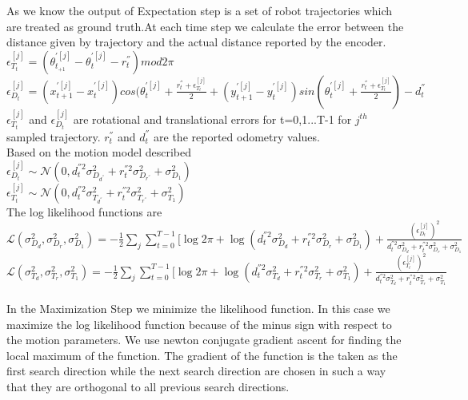 \documentclass[12pt]{dalcsthesis}
\begin{document}
As we know the output of Expectation step is a set of robot trajectories which are treated as ground truth.At each time step we calculate the error between the distance given by trajectory and the actual distance reported by the encoder.
\\
$\epsilon_{T_{t}}^{[j]}=(\theta_{t_{+1}}^{'[j]}-\theta_{t}^{'[j]}-r_{t}^{''})mod2\pi$ 
\\
$\epsilon_{D_{t}}^{[j]}=(x_{t+1}^{'[j]}-x_{t}^{'[j]})cos(\theta_{t}^{'[j]}+\frac{r_{t}^{''}+\epsilon_{T_{t}}^{[j]}}{2}+(y_{t+1}^{'[j]}-y_{t}^{'[j]})sin(\theta_{t}^{'[j]}+\frac{r_{t}^{''}+\epsilon_{T_{t}}^{[j]}}{2})-d_{t}^{''}$
\\
$\epsilon_{T_{t}}^{[j]}$ and $\epsilon_{D_{t}}^{[j]}$ are rotational and translational errors for t=0,1...T-1 for $j^{th}$ sampled trajectory. $r_{t}^{''}$ and $d_{t}^{''}$ are the reported odometry values. 
\\
Based on the motion model described 
\\
$\epsilon_{D_{t}}^{[j]}\sim\mathcal{{N}}(0,d_{t}^{''2}\sigma_{D_{d^{''}}}^{2}+r_{t}^{''2}\sigma_{D_{r^{''}}}^{2}+\sigma_{D_{1}}^{2})$
\\
$\epsilon_{T_{t}}^{[j]}\sim\mathcal{{N}}(0,d_{t}^{''2}\sigma_{T_{d^{''}}}^{2}+r_{t}^{''2}\sigma_{T_{r^{''}}}^{2}+\sigma_{T_{1}}^{2})$
\\
The log likelihood functions are
\\
$\mathcal{{L}}(\sigma_{D_{d}}^{2},\sigma_{D_{r}}^{2},\sigma_{D_{1}}^{2})=-\frac{1}{2}\sum_{j}\sum_{t=0}^{T-1}[\log2\pi+\log(d_{t}^{''2}\sigma_{D_{d}}^{2}+r_{t}^{''2}\sigma_{D_{r}}^{2}+\sigma_{D_{1}}^{2})+\frac{(\epsilon_{D_{t}}^{[j]})^{2}}{d_{t}^{''2}\sigma_{D_{d}}^{2}+r_{t}^{''2}\sigma_{D_{r}}^{2}+\sigma_{D_{1}}^{2}}$
\\
$\mathcal{{L}}(\sigma_{T_{d}}^{2},\sigma_{T_{r}}^{2},\sigma_{T_{1}}^{2})=-\frac{1}{2}\sum_{j}\sum_{t=0}^{T-1}[\log2\pi+\log(d_{t}^{''2}\sigma_{T_{d}}^{2}+r_{t}^{''2}\sigma_{T_{r}}^{2}+\sigma_{T_{1}}^{2})+\frac{(\epsilon_{T_{t}}^{[j]})^{2}}{d_{t}^{''2}\sigma_{T_{d}}^{2}+r_{t}^{''2}\sigma_{T_{r}}^{2}+\sigma_{T_{1}}^{2}}$
\\
\\
In the Maximization Step we minimize the likelihood function. In this
case we maximize the log likelihood function because of the minus
sign with respect to the motion parameters. We use newton conjugate
gradient ascent for finding the local maximum of the function. The
gradient of the function is the taken as the first search direction
while the next search direction are chosen in such a way that they
are orthogonal to all previous search directions.
\end{document}
